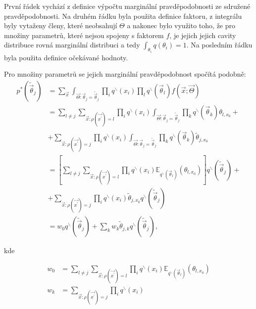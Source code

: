 První řádek vychází z definice výpočtu marginální pravděpodobnosti ze sdružené
pravděpodobnosti.
Na druhém řádku byla použita definice faktoru, z integrálu byly vytaženy členy,
které neobsahují $\Theta$ a nakonec bylo využito toho, že pro množiny
parametrů, které nejsou spojeny s faktorem $f$, je jejich jejich cavity
distribuce rovná marginální distribuci a tedy $\int_{\theta_i} q(\theta_i) =
1$. Na posledním řádku byla použita definice očekávané hodnoty.

Pro množiny parametrů se jejich marginální pravděpodobnost spočítá podobně:
\begin{align}
p^*(\tilde{\vec{\theta}}_j) & = \sum_{\vec{x}} \int_{\vec{\Theta}:
    \vec{\theta}_j = \tilde{\vec{\theta}}_j} \prod_i q^\backslash(x_i) \prod_l
    q^\backslash(\vec{\theta}_l) f(\vec{x}; \vec{\Theta}) \label{eq:ep:theta_1}
\\
& = \sum_{l \ne j} \sum_{\vec{x}: \rho(\vec{x^\prime}) = l} \prod_i
    q^\backslash(x_i) \int_{\vec{\Theta}: \vec{\theta}_j =
    \tilde{\vec{\theta}}_j} \prod_k q^\backslash(\vec{\theta}_k) \theta_{l,
    x_0} + \label{eq:ep:theta_2}
\\
&   + \sum_{\vec{x}: \rho(\vec{x^\prime}) = j} \prod_i q^\backslash(x_i)
    \int_{\vec{\Theta}: \vec{\theta}_j = \tilde{\vec{\theta}}_j} \prod_k
    q^\backslash(\vec{\theta}_k) \tilde{\theta}_{j, x_0}
\nonumber
\\
& = \left[ \sum_{l \ne j} \sum_{\vec{x}: \rho(\vec{x^\prime}) = l} \prod_i
    q^\backslash(x_i) \mathbb{E}_{q^\backslash(\vec{\theta}_l)} (\theta_{l,
    x_0}) \right] q^\backslash(\tilde{\vec{\theta}}_j) + \label{eq:ep:theta_3}
\\
&   + \sum_{\vec{x}: \rho(\vec{x^\prime}) = j} \prod_i q^\backslash(x_i)
    \tilde{\theta}_{j,x_0} q^\backslash(\tilde{\vec{\theta}}_j)
\label{eq:ep:theta_4}
\nonumber
\\
& = w_0 q^\backslash(\tilde{\vec{\theta}}_j) + \sum_k w_k
    \tilde{\theta}_{j,k} q^\backslash(\tilde{\vec{\theta}}_j),
\end{align}

kde

\begin{align}
w_0 & = \sum_{l \ne j} \sum_{\vec{x}: \rho(\vec{x^\prime}) = l} \prod_i
    q^\backslash(x_i) \mathbb{E}_{q^\backslash(\vec{\theta}_l)} (\theta_{l,
    x_0}) \\
w_k & = \sum_{\vec{x}: \rho(\vec{x^\prime}) = j} \prod_i q^\backslash(x_i)
\end{align}

